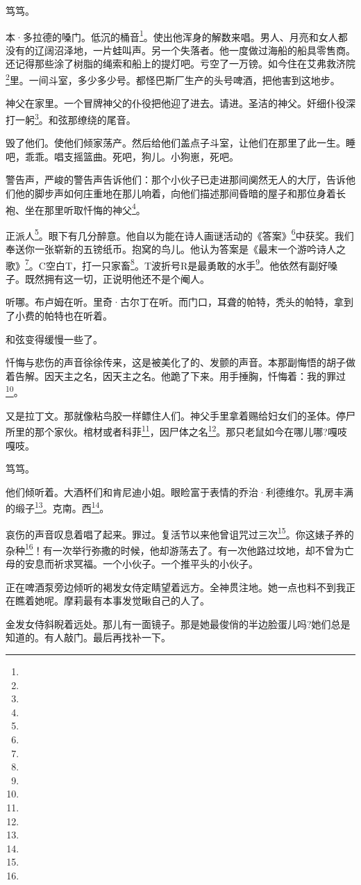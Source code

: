 \par 笃笃。
\par 本·多拉德的嗓门。低沉的桶音\footnote{}。使出他浑身的解数来唱。男人、月亮和女人都没有的辽阔沼泽地，一片蛙叫声。另一个失落者。他一度做过海船的船具零售商。还记得那些涂了树脂的绳索和船上的提灯吧。亏空了一万镑。如今住在艾弗救济院\footnote{}里。一间斗室，多少多少号。都怪巴斯厂生产的头号啤酒，把他害到这地步。
\par 神父在家里。一个冒牌神父的仆役把他迎了进去。请进。圣洁的神父。奸细仆役深打一躬\footnote{}。和弦那缭绕的尾音。
\par 毁了他们。使他们倾家荡产。然后给他们盖点子斗室，让他们在那里了此一生。睡吧，乖乖。唱支摇篮曲。死吧，狗儿。小狗崽，死吧。
\par 警告声，严峻的警告声告诉他们：那个小伙子已走进那间阒然无人的大厅，告诉他们他的脚步声如何庄重地在那儿响着，向他们描述那间昏暗的屋子和那位身着长袍、坐在那里听取忏悔的神父\footnote{}。
\par 正派人\footnote{}。眼下有几分醉意。他自以为能在诗人画谜活动的《答案》\footnote{}中获奖。我们奉送你一张崭新的五镑纸币。抱窝的鸟儿。他认为答案是《最末一个游吟诗人之歌》\footnote{}。C空白T，打一只家畜\footnote{}。T波折号R是最勇敢的水手\footnote{}。他依然有副好嗓子。既然拥有这一切，正说明他还不是个阉人。
\par 听哪。布卢姆在听。里奇·古尔丁在听。而门口，耳聋的帕特，秃头的帕特，拿到了小费的帕特也在听着。
\par 和弦变得缓慢一些了。
\par 忏悔与悲伤的声音徐徐传来，这是被美化了的、发颤的声音。本那副悔悟的胡子做着告解。因天主之名，因天主之名。他跪了下来。用手捶胸，忏悔着：我的罪过\footnote{}。
\par 又是拉丁文。那就像粘鸟胶一样鳔住人们。神父手里拿着赐给妇女们的圣体。停尸所里的那个家伙。棺材或者科菲\footnote{}，因尸体之名\footnote{}。那只老鼠如今在哪儿哪?嘎吱嘎吱。
\par 笃笃。
\par 他们倾听着。大酒杯们和肯尼迪小姐。眼睑富于表情的乔治·利德维尔。乳房丰满的缎子\footnote{}。克南。西\footnote{}。
\par 哀伤的声音叹息着唱了起来。罪过。复活节以来他曾诅咒过三次\footnote{}。你这婊子养的杂种\footnote{}！有一次举行弥撒的时候，他却游荡去了。有一次他路过坟地，却不曾为亡母的安息而祈求冥福。一个小伙子。一个推平头的小伙子。
\par 正在啤酒泵旁边倾听的褐发女侍定睛望着远方。全神贯注地。她一点也料不到我正在瞧着她呢。摩莉最有本事发觉瞅自己的人了。
\par 金发女侍斜睨着远处。那儿有一面镜子。那是她最俊俏的半边脸蛋儿吗?她们总是知道的。有人敲门。最后再找补一下。
